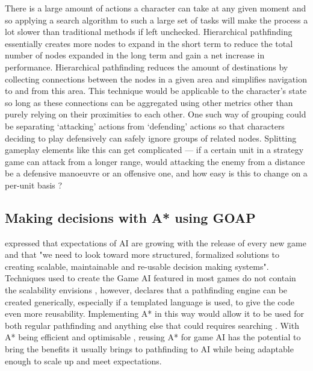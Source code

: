 \documentclass[11pt, a4paper]{report}
\begin{document}
There is a large amount of actions a character can take at any given moment \parencite[62]{nareyek2004ai} and so applying a search algorithm to such a large set of tasks will make the process a lot slower than traditional methods if left unchecked. Hierarchical pathfinding essentially creates more nodes to expand in the short term to reduce the total number of nodes expanded in the long term and gain a net increase in performance. Hierarchical pathfinding reduces the amount of destinations by collecting connections between the nodes in a given area and simplifies navigation to and from this area. This technique would be applicable to the character's state so long as these connections can be aggregated using other metrics other than purely relying on their proximities to each other. One such way of grouping  could be separating `attacking' actions from `defending' actions so that characters deciding to play defensively can safely ignore groups of related nodes. Splitting gameplay elements like this can get complicated --- if a certain unit in a strategy game can attack from a longer range, would attacking the enemy from a distance be a defensive manoeuvre or an offensive one, and how easy is this to change on a per-unit basis \parencite{weber2011building}?

\subsection{Making decisions with A* using GOAP}
\label{subsec:makingDecisionsWithAStarUsingGOAP}

\citeauthor{orkin2003applying} \parencite*[11]{orkin2003applying} expressed that expectations of AI are growing with the release of every new game and that "we need to look toward more structured, formalized solutions to creating scalable, maintainable and re-usable decision making systems". Techniques used to create the Game AI featured in most games do not contain the scalability \citeauthor{orkin2003applying} envisions \parencite[17]{laird2001human}, however, \citeauthor{higgins2002generic} \parencite*[117]{higgins2002generic} declares that a pathfinding engine can be created generically, especially if a templated language is used, to give the code even more reusability. Implementing A* in this way would allow it to be used for both regular pathfinding and anything else that could requires searching \parencite[120]{higgins2002generic}. With A* being efficient and optimisable \parencite[215]{millington2019ai}, reusing A* for game AI has the potential to bring the benefits it usually brings to pathfinding to AI while being adaptable enough to scale up and meet expectations.
\end{document}
